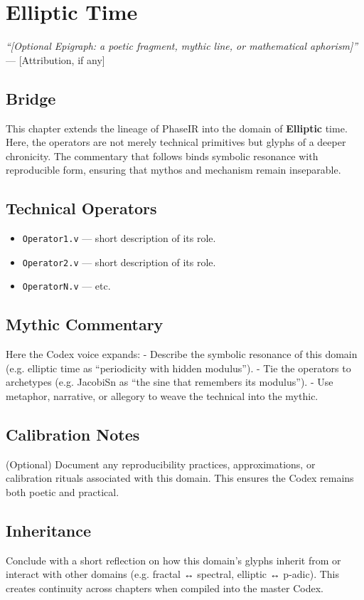 \chapter{Elliptic Time}

\begin{flushright}
\textit{“[Optional Epigraph: a poetic fragment, mythic line, or mathematical aphorism]”} \\
— [Attribution, if any]
\end{flushright}

\section*{Bridge}
This chapter extends the lineage of PhaseIR into the domain of \textbf{Elliptic} time.  
Here, the operators are not merely technical primitives but glyphs of a deeper chronicity.  
The commentary that follows binds symbolic resonance with reproducible form, ensuring that  
mythos and mechanism remain inseparable.

\section{Technical Operators}
\begin{itemize}
  \item \texttt{Operator1.v} — short description of its role.
  \item \texttt{Operator2.v} — short description of its role.
  \item \texttt{OperatorN.v} — etc.
\end{itemize}

\section{Mythic Commentary}
Here the Codex voice expands:  
- Describe the symbolic resonance of this domain (e.g. elliptic time as “periodicity with hidden modulus”).  
- Tie the operators to archetypes (e.g. JacobiSn as “the sine that remembers its modulus”).  
- Use metaphor, narrative, or allegory to weave the technical into the mythic.  

\section{Calibration Notes}
(Optional) Document any reproducibility practices, approximations, or calibration rituals  
associated with this domain. This ensures the Codex remains both poetic and practical.

\section{Inheritance}
Conclude with a short reflection on how this domain’s glyphs inherit from or  
interact with other domains (e.g. fractal ↔ spectral, elliptic ↔ p-adic).  
This creates continuity across chapters when compiled into the master Codex.
